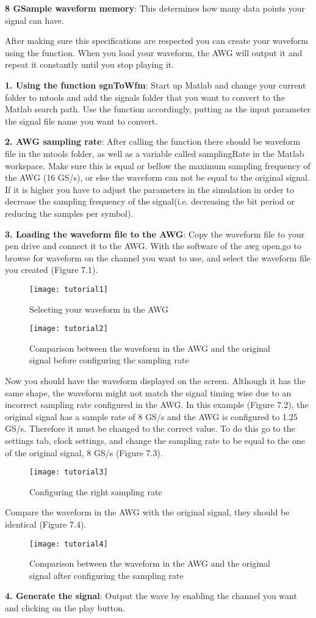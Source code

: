 \textbf{8 GSample waveform memory}: This determines how many data points your signal can have.
\bigskip

After making sure this specifications are respected you can create your waveform using the function. When you load your waveform, the AWG will output it and repeat it constantly until you stop playing it.
\bigskip

\textbf{1. Using the function sgnToWfm}:
Start up Matlab and change your current folder to mtools and add the signals folder that you want to convert to the Matlab search path. Use the function accordingly, putting as the input parameter the signal file name you want to convert.
\bigskip

\noindent
\textbf{2. AWG sampling rate}:
After calling the function there should be waveform file in the mtools folder, as well as a variable called samplingRate in the Matlab workspace. Make sure this is equal or bellow the maximum sampling frequency of the AWG (16 GS/s), or else the waveform can not be equal to the original signal. If it is higher you  have to adjust the parameters in the simulation in order to decrease the sampling frequency of the signal(i.e. decreasing the bit period or reducing the samples per symbol).
\bigskip

\noindent
\textbf{3. Loading the waveform file to the AWG}:
Copy the waveform file to your pen drive and connect it to the AWG. With the software of the awg open,go to browse for waveform on the channel you want to use, and select the waveform file you created (Figure 7.1).

\begin{figure}[h]
	\centering
	\texttt{[image: tutorial1]}
	\label{TUT_SelectingWFM}\caption{Selecting your waveform in the AWG}
\end{figure}
\begin{figure}[h]
	\centering
	\texttt{[image: tutorial2]}
	\label{TUT_CompBad}\caption{Comparison between the waveform in the AWG and the original signal before configuring the sampling rate}
\end{figure}

Now you should have the waveform displayed on the screen. Although it has the same shape,  the waveform might not match the signal timing wise due to an incorrect sampling rate  configured in the AWG.
In this example (Figure 7.2), the original signal has a sample rate of 8 GS/s and the AWG is configured to 1.25 GS/s. Therefore it must be changed to the correct value.
To do this go to the settings tab, clock settings, and change the sampling rate to be equal to the one of the original signal, 8 GS/s (Figure 7.3).
\begin{figure}[h]
	\centering
	\texttt{[image: tutorial3]}
	\label{TUT_ConfigSR}\caption{Configuring the right sampling rate}
\end{figure}
Compare the waveform in the AWG with the original signal, they should be identical (Figure 7.4).
\begin{figure}[h]
	\centering
	\texttt{[image: tutorial4]}
	\label{TUT_CompGood}\caption{Comparison between the waveform in the AWG and the original signal after configuring the sampling rate}
\end{figure}
\bigskip

\noindent
\textbf{4. Generate the signal}:
Output the wave by enabling the channel you want and clicking on the play button.


% 
